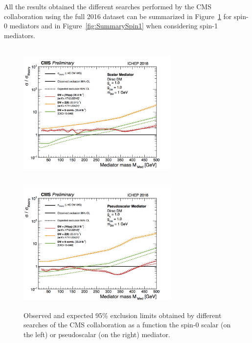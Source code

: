 \documentclass[a4paper, 10pt, openright]{report}
\begin{document}
All the results obtained the different searches performed by the \ac{CMS} collaboration using the full 2016 dataset can be summarized in Figure~\ref{fig:SummarySpin0} for spin-0 mediators and in Figure~\ref{fig:SummarySpin1} when considering spin-1 mediators.

\begin{figure}[htbp]
\centering
\begin{minipage}[b]{.47\textwidth}
\includegraphics[width=8cm, height=7cm]{figs/SummaryScalar.png}
\end{minipage}\hfill
\begin{minipage}[b]{.47\textwidth}
\includegraphics[width=8cm, height=7cm]{figs/SummaryPseudoScalar.png}
\end{minipage} \hfill
\caption{Observed and expected 95\% exclusion limits obtained by different searches of the \ac{CMS} collaboration as a function the spin-0 scalar (on the left) or pseudoscalar (on the right) mediator.}
\label{fig:SummarySpin0}
\end{figure}
\end{document}
